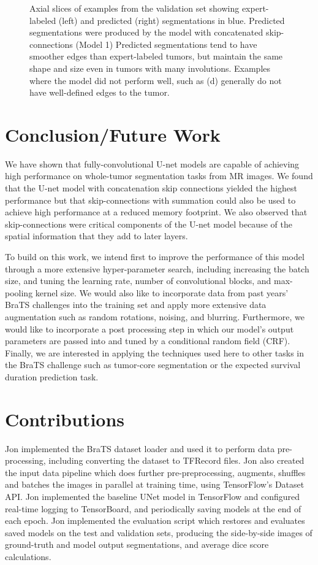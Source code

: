 \documentclass{article}
\newcommand\tab[1][0.5cm]{\hspace*{#1}}
\begin{document}
\begin{figure}[!ht]
\caption{Axial slices of examples from the validation set showing expert-labeled (left) and predicted (right) segmentations in blue. Predicted segmentations were produced by the model with concatenated skip-connections (Model 1) Predicted segmentations tend to have smoother edges than expert-labeled tumors, but maintain the same shape and size even in tumors with many involutions. Examples where the model did not perform well, such as (d) generally do not have well-defined edges to the tumor.}
\end{figure}

\section{Conclusion/Future Work}
\tab We have shown that fully-convolutional U-net models are capable of achieving high performance on whole-tumor segmentation tasks from MR images. We found that the U-net model with concatenation skip connections yielded the highest performance but that skip-connections with summation could also be used to achieve high performance at a reduced memory footprint. We also observed that skip-connections were critical components of the U-net model because of the spatial information that they add to later layers.

To build on this work, we intend first to improve the performance of this model through a more extensive hyper-parameter search, including increasing the batch size, and tuning the learning rate, number of convolutional blocks, and max-pooling kernel size. We would also like to incorporate data from past years' BraTS challenges into the training set and apply more extensive data augmentation such as random rotations, noising, and blurring. Furthermore, we would like to incorporate a post processing step in which our model’s output parameters are passed into and tuned by a conditional random field (CRF). Finally, we are interested in applying the techniques used here to other tasks in the BraTS challenge such as tumor-core segmentation or the expected survival duration prediction task.

\section{Contributions}
Jon implemented the BraTS dataset loader and used it to perform data pre-processing, including converting the dataset to TFRecord files. Jon also created the input data pipeline which does further pre-preprocessing, augments, shuffles and batches the images in parallel at training time, using TensorFlow's Dataset API. Jon implemented the baseline UNet  model in TensorFlow and configured real-time logging to TensorBoard, and periodically saving models at the end of each epoch. Jon implemented the evaluation script which restores and evaluates saved models on the test and validation sets, producing the side-by-side images of ground-truth and model output segmentations, and average dice score calculations.
\end{document}
